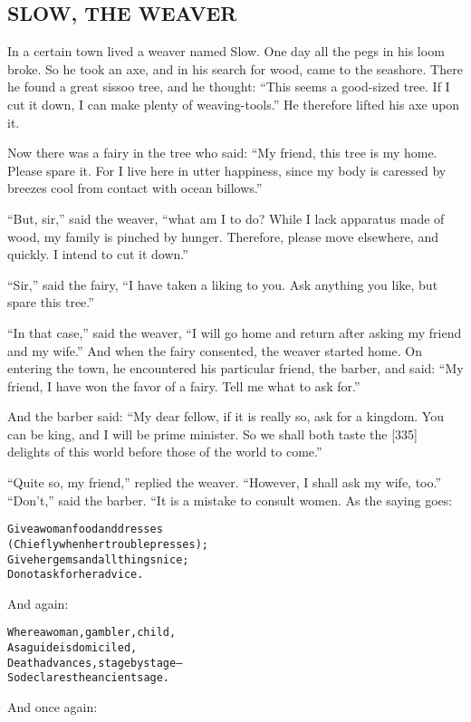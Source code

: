 \documentclass{article}
\renewenvironment{verbatim}{\begin{alltt}\normalfont\begin{centering}}{\end{centering}\end{alltt}}
\begin{document}
\subsection{SLOW, THE WEAVER}

In a certain town lived a weaver named Slow. One day all the pegs
in his loom broke. So he took an axe, and in his search for wood,
came to the seashore. There he found a great sissoo tree, and he
thought:
``This seems a good-sized tree. If I cut it down, I can make plenty of weaving-tools.''
He therefore lifted his axe upon it.

Now there was a fairy in the tree who said:
``My friend, this tree is my home. Please spare it. For I live here in utter happiness, since my body is caressed by breezes cool from contact with ocean billows.''

``But, sir,'' said the weaver,
``what am I to do? While I lack apparatus made of wood, my family is pinched by hunger. Therefore, please move elsewhere, and quickly. I intend to cut it down.''

``Sir,'' said the fairy,
``I have taken a liking to you. Ask anything you like, but spare this tree.''

``In that case,'' said the weaver,
``I will go home and return after asking my friend and my wife.''
And when the fairy consented, the weaver started home. On entering
the town, he encountered his particular friend, the barber, and
said:
``My friend, I have won the favor of a fairy. Tell me what to ask for.''

And the barber said:
``My dear fellow, if it is really so, ask for a kingdom. You can be king, and I will be prime minister. So we shall both taste the [335] delights of this world before those of the world to come.''

``Quite so, my friend,'' replied the weaver.
``However, I shall ask my wife, too.'' ``Don't,'' said the barber.
“It is a mistake to consult women. As the saying goes:

\begin{verbatim}
Give a woman food and dresses
(Chiefly when her trouble presses);
Give her gems and all things nice;
Do not ask for her advice.
\end{verbatim}
And again:

\begin{verbatim}
Where a woman, gambler, child,
As a guide is domiciled,
Death advances, stage by stage--
So declares the ancient sage.
\end{verbatim}
And once again:
\end{document}
